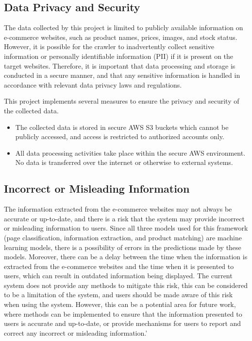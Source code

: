 \subsection{Data Privacy and Security}\label{subsec:data-privacy-and-security}
The data collected by this project is limited to publicly available information on e-commerce websites, such as product names, prices, images, and stock status.
However, it is possible for the crawler to inadvertently collect sensitive information or personally identifiable information (PII) if it is present on the target websites.
Therefore, it is important that data processing and storage is conducted in a secure manner, and that any sensitive information is handled in accordance with relevant data privacy laws and regulations.

This project implements several measures to ensure the privacy and security of the collected data.
\begin{itemize}
    \item The collected data is stored in secure AWS S3 buckets which cannot be publicly accessed, and access is restricted to authorized accounts only.
    \item All data processing activities take place within the secure AWS environment.
    No data is transferred over the internet or otherwise to external systems.
\end{itemize}

\subsection{Incorrect or Misleading Information}\label{subsec:incorrect-or-misleading-information}
The information extracted from the e-commerce websites may not always be accurate or up-to-date, and there is a risk that the system may provide incorrect or misleading information to users.
Since all three models used for this framework (page classification, information extraction, and product matching) are machine learning models, there is a possibility of errors in the predictions made by these models.
Moreover, there can be a delay between the time when the information is extracted from the e-commerce websites and the time when it is presented to users, which can result in outdated information being displayed.
The current system does not provide any methods to mitigate this risk, this can be considered to be a limitation of the system, and users should be made aware of this risk when using the system.
However, this can be a potential area for future work, where methods can be implemented to ensure that the information presented to users is accurate and up-to-date, or provide mechanisms for users to report and correct any incorrect or misleading information.'


